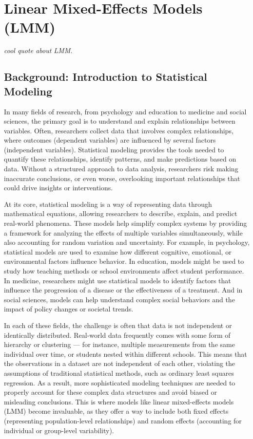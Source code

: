 \chapter{Linear Mixed-Effects Models (LMM)}

\epigraph{\textit{cool quote about LMM.}}{}

\minitoc
\newpage
\section{Background: Introduction to Statistical Modeling}
In many fields of research, from psychology and education to medicine and social sciences, the primary goal is to understand and explain relationships between variables. Often, researchers collect data that involves complex relationships, where outcomes (dependent variables) are influenced by several factors (independent variables). Statistical modeling provides the tools needed to quantify these relationships, identify patterns, and make predictions based on data. Without a structured approach to data analysis, researchers risk making inaccurate conclusions, or even worse, overlooking important relationships that could drive insights or interventions.

At its core, statistical modeling is a way of representing data through mathematical equations, allowing researchers to describe, explain, and predict real-world phenomena. These models help simplify complex systems by providing a framework for analyzing the effects of multiple variables simultaneously, while also accounting for random variation and uncertainty. For example, in psychology, statistical models are used to examine how different cognitive, emotional, or environmental factors influence behavior. In education, models might be used to study how teaching methods or school environments affect student performance. In medicine, researchers might use statistical models to identify factors that influence the progression of a disease or the effectiveness of a treatment. And in social sciences, models can help understand complex social behaviors and the impact of policy changes or societal trends.

In each of these fields, the challenge is often that data is not independent or identically distributed. Real-world data frequently comes with some form of hierarchy or clustering — for instance, multiple measurements from the same individual over time, or students nested within different schools. This means that the observations in a dataset are not independent of each other, violating the assumptions of traditional statistical methods, such as ordinary least squares regression. As a result, more sophisticated modeling techniques are needed to properly account for these complex data structures and avoid biased or misleading conclusions. This is where models like linear mixed-effects models (LMM) become invaluable, as they offer a way to include both fixed effects (representing population-level relationships) and random effects (accounting for individual or group-level variability).

